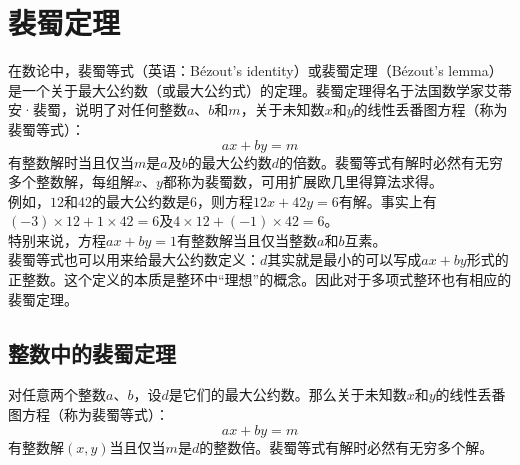 \documentclass[UTF8]{ctexart}
\begin{document}
\section*{裴蜀定理}
在数论中，裴蜀等式（英语：Bézout's identity）或裴蜀定理（Bézout's lemma）是一个关于最大公约数（或最大公约式）的定理。裴蜀定理得名于法国数学家艾蒂安·裴蜀，说明了对任何整数$a$、$b$和$m$，关于未知数$x$和$y$的线性丢番图方程（称为裴蜀等式）：
\[ ax + by = m \]
有整数解时当且仅当$m$是$a$及$b$的最大公约数$d$的倍数。裴蜀等式有解时必然有无穷多个整数解，每组解$x$、$y$都称为裴蜀数，可用扩展欧几里得算法求得。\\
例如，$12$和$42$的最大公约数是$6$，则方程$12x + 42y = 6$有解。事实上有$(-3) \times 12 + 1 \times 42 = 6$及$4 \times 12 + (-1) \times 42 = 6$。\\
特别来说，方程$ax + by = 1$有整数解当且仅当整数$a$和$b$互素。\\
裴蜀等式也可以用来给最大公约数定义：$d$其实就是最小的可以写成$ax + by$形式的正整数。这个定义的本质是整环中“理想”的概念。因此对于多项式整环也有相应的裴蜀定理。
\subsection*{整数中的裴蜀定理}
对任意两个整数$a$、$b$，设$d$是它们的最大公约数。那么关于未知数$x$和$y$的线性丢番图方程（称为裴蜀等式）：
\[ ax + by = m \]
有整数解$(x,y)$当且仅当$m$是$d$的整数倍。裴蜀等式有解时必然有无穷多个解。
\end{document}
